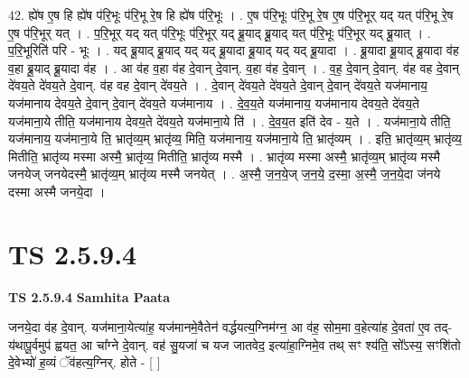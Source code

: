 \documentclass[17pt]{extarticle}
\begin{document}
42. ह्ये॑ष ए॒ष हि ह्ये॑ष प॑रि॒भूः प॑रि॒भू रे॒ष हि ह्ये॑ष प॑रि॒भूः । . ए॒ष प॑रि॒भूः प॑रि॒भू रे॒ष ए॒ष प॑रि॒भूर् यद् यत् प॑रि॒भू रे॒ष ए॒ष प॑रि॒भूर् यत् । . प॒रि॒भूर् यद् यत् प॑रि॒भूः प॑रि॒भूर् यद् ब्रू॒याद् ब्रू॒याद् यत् प॑रि॒भूः प॑रि॒भूर् यद् ब्रू॒यात् । . प॒रि॒भूरिति॑ परि - भूः । . यद् ब्रू॒याद् ब्रू॒याद् यद् यद् ब्रू॒यादा ब्रू॒याद् यद् यद् ब्रू॒यादा । . ब्रू॒यादा ब्रू॒याद् ब्रू॒यादा व॑ह व॒हा ब्रू॒याद् ब्रू॒यादा व॑ह । . आ व॑ह व॒हा व॑ह दे॒वान् दे॒वान्. व॒हा व॑ह दे॒वान् । . व॒ह॒ दे॒वान् दे॒वान्. व॑ह वह दे॒वान् दे॑वय॒ते दे॑वय॒ते दे॒वान्. व॑ह वह दे॒वान् दे॑वय॒ते । . दे॒वान् दे॑वय॒ते दे॑वय॒ते दे॒वान् दे॒वान् दे॑वय॒ते यज॑मानाय॒ यज॑मानाय देवय॒ते दे॒वान् दे॒वान् दे॑वय॒ते यज॑मानाय । . दे॒व॒य॒ते यज॑मानाय॒ यज॑मानाय देवय॒ते दे॑वय॒ते यज॑माना॒ये तीति॒ यज॑मानाय देवय॒ते दे॑वय॒ते यज॑माना॒ये ति॑ । . दे॒व॒य॒त इति॑ देव - य॒ते । . यज॑माना॒ये तीति॒ यज॑मानाय॒ यज॑माना॒ये ति॒ भ्रातृ॑व्य॒म् भ्रातृ॑व्य॒ मिति॒ यज॑मानाय॒ यज॑माना॒ये ति॒ भ्रातृ॑व्यम् । . इति॒ भ्रातृ॑व्य॒म् भ्रातृ॑व्य॒ मितीति॒ भ्रातृ॑व्य मस्मा अस्मै॒ भ्रातृ॑व्य॒ मितीति॒ भ्रातृ॑व्य मस्मै । . भ्रातृ॑व्य मस्मा अस्मै॒ भ्रातृ॑व्य॒म् भ्रातृ॑व्य मस्मै जनयेज् जनयेदस्मै॒ भ्रातृ॑व्य॒म् भ्रातृ॑व्य मस्मै जनयेत् । . अ॒स्मै॒ ज॒न॒ये॒ज् ज॒न॒ये॒ द॒स्मा॒ अ॒स्मै॒ ज॒न॒ये॒दा ज॑नये दस्मा अस्मै जनये॒दा । \newline
\pagebreak
{}

\section{ TS 2.5.9.4 }

\textbf{TS 2.5.9.4 } \newline
\textbf{Samhita Paata} \newline

जनये॒दा व॑ह दे॒वान्. यज॑माना॒येत्या॑ह॒ यज॑मानमे॒वैतेन॑ वर्द्धयत्य॒ग्निम॑ग्न॒ आ व॑ह॒ सोम॒मा व॒हेत्या॑ह दे॒वता॑ ए॒व तद्-य॑थापू॒र्वमुप॑ ह्वयत॒ आ चा᳚ग्ने दे॒वान्. वह॑ सु॒यजा॑ च यज जातवेद॒ इत्या॑हा॒ग्निमे॒व तथ् सꣳ श्य॑ति॒ सो᳚ऽस्य॒ सꣳशि॑तो दे॒वेभ्यो॑ ह॒व्यं ॅव॑हत्य॒ग्निर्. होते - [  ] \newline
\end{document}

